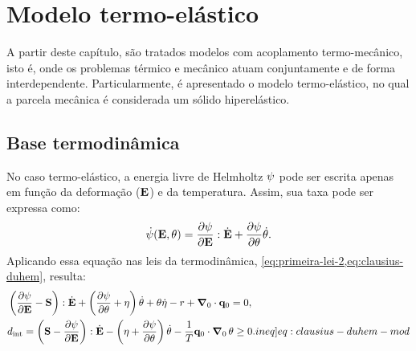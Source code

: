 \documentclass[Tese.tex]{subfiles}
\begin{document}
	
\chapter{Modelo termo-elástico}\label{ch:termo-elasticidade}

A partir deste capítulo, são tratados modelos com acoplamento termo-mecânico, isto é, onde os problemas térmico e mecânico atuam conjuntamente e de forma interdependente. Particularmente, é apresentado o modelo termo-elástico, no qual a parcela mecânica é considerada um sólido hiperelástico.

\section{Base termodinâmica}

No caso termo-elástico, a energia livre de Helmholtz $\psi$ pode ser escrita apenas em função da deformação ($\mathbf{E}$) e da temperatura. Assim, sua taxa pode ser expressa como:
\begin{equation}
\dot{\psi}(\mathbf{E},\theta) = \dfrac{\partial \psi}{\partial \mathbf{E}}:\dot{\mathbf{E}} + \dfrac{\partial \psi}{\partial \theta}\dot{\theta}.
\end{equation}
Aplicando essa equação nas leis da termodinâmica, \cref{eq:primeira-lei-2,eq:clausius-duhem}, resulta:
\begin{align}
& \left(\dfrac{\partial \helmholtz}{\partial \E} - \S\right):\dotE  + \left(\dfrac{\partial \helmholtz}{\partial \temp} +  {\entropy}\right)\dottemp  + \temp \dotentropy - \calorInt + \gradientei\cdot\qi = 0, \label{eq:primeira-lei-mod} \\
&\dissipation = \left(\S - \dfrac{\partial \helmholtz}{\partial \E}\right):\dotE - \left({\entropy} + \dfrac{\partial \helmholtz}{\partial \temp}\right)\dottemp - \dfrac{1}{T}\qi\cdot\gradientei\,\temp \geq 0. \label[ineq]{eq:clausius-duhem-mod}
\end{align}
\end{document}
